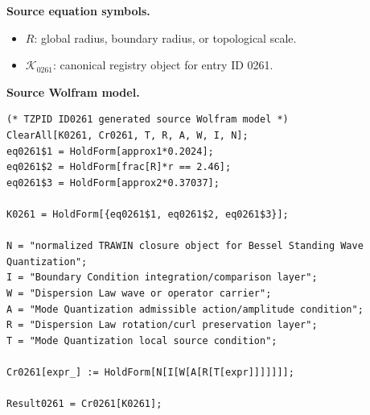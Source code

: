 \begin{minipage}[t]{0.49\linewidth}
\begingroup
\small
\raggedright
\textbf{Source equation symbols.}\par
\begin{itemize}[leftmargin=1.35em,itemsep=1pt,topsep=1pt,parsep=0pt]
    \item $R$: global radius, boundary radius, or topological scale.
    \item $\mathcal{K}_{0261}$: canonical registry object for entry ID 0261.
\end{itemize}
\endgroup
\end{minipage}\hfill
\begin{minipage}[t]{0.47\linewidth}
\begingroup
\scriptsize
\raggedright
\textbf{Source Wolfram model.}\par
\begin{Verbatim}[fontsize=\tiny,breaklines=true,breakanywhere=true]
(* TZPID ID0261 generated source Wolfram model *)
ClearAll[K0261, Cr0261, T, R, A, W, I, N];
eq0261$1 = HoldForm[approx1*0.2024];
eq0261$2 = HoldForm[frac[R]*r == 2.46];
eq0261$3 = HoldForm[approx2*0.37037];

K0261 = HoldForm[{eq0261$1, eq0261$2, eq0261$3}];

N = "normalized TRAWIN closure object for Bessel Standing Wave Quantization";
I = "Boundary Condition integration/comparison layer";
W = "Dispersion Law wave or operator carrier";
A = "Mode Quantization admissible action/amplitude condition";
R = "Dispersion Law rotation/curl preservation layer";
T = "Mode Quantization local source condition";

Cr0261[expr_] := HoldForm[N[I[W[A[R[T[expr]]]]]]];

Result0261 = Cr0261[K0261];
\end{Verbatim}
\endgroup
\end{minipage}

